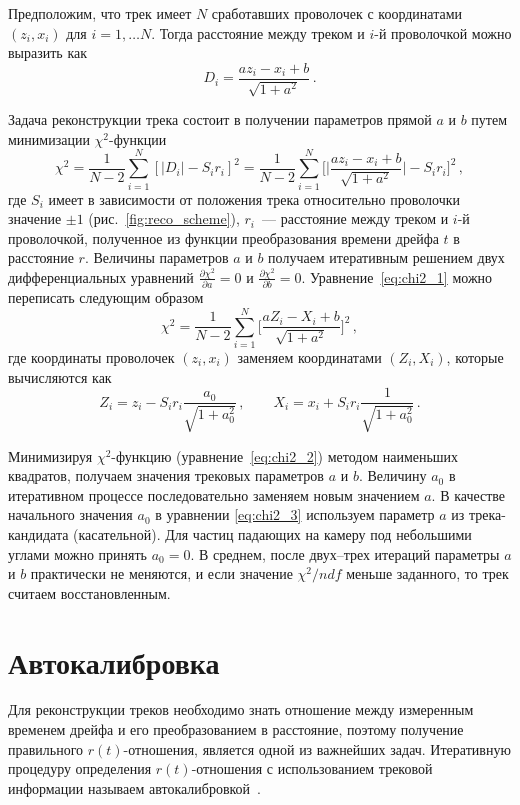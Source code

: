 Предположим, что трек имеет $N$ сработавших проволочек с координатами
$(z_i, x_i)$ для $i = 1, \ldots N$. Тогда расстояние между треком и $i$-й
проволочкой можно выразить как
\begin{equation}
  D_i = \frac{a z_i - x_i + b}{\sqrt{1 + a^{2}}}\,.
\end{equation}

Задача реконструкции трека состоит в получении параметров прямой $a$ и $b$
путем минимизации $\chi^2$-функции
\begin{equation}
  \label{eq:chi2_1}
  \chi^2 = \frac{1}{N-2}\sum_{i=1}^{N} [|D_i| -S_ir_i]^2 =
  \frac{1}{N-2}\sum_{i=1}^{N} \biggl[
    \Big|\frac{az_i - x_i + b}{\sqrt{1 + a^2}}\Big| - S_ir_i\biggr]^2\,,
\end{equation}
где $S_i$ имеет в зависимости от положения трека относительно проволочки
значение $\pm{1}$ (рис.~\ref{fig:reco_scheme}), $r_i$~--- расстояние между
треком и $i$-й проволочкой, полученное из функции преобразования времени дрейфа
$t$ в расстояние $r$. Величины параметров $a$ и $b$ получаем итеративным
решением двух дифференциальных уравнений
$\frac{\partial \chi^2}{\partial a} = 0$ и
$\frac{\partial \chi^2}{\partial b} = 0$.
Уравнение~\eqref{eq:chi2_1} можно переписать следующим образом
\begin{equation}
  \label{eq:chi2_2}
  \chi^2 = \frac{1}{N-2}\sum_{i=1}^{N}
  \biggl[\frac{aZ_i - X_i + b}{\sqrt{1 + a^2}}\biggr]^2\,,
\end{equation}
где координаты проволочек $(z_i, x_i)$ заменяем координатами $(Z_i, X_i)$,
которые вычисляются как
\begin{equation}
  \label{eq:chi2_3}
  Z_i = z_i - S_ir_i \frac{a_0}{\sqrt{1 + a_0^2}}\,, \qquad
  X_i = x_i + S_ir_i \frac{1}{\sqrt{1 + a_0^2}}\,.
\end{equation}

Минимизируя $\chi^2$-функцию (уравнение~\eqref{eq:chi2_2}) методом наименьших
квадратов, получаем значения трековых параметров $a$ и $b$. Величину $a_0$ в
итеративном процессе последовательно заменяем новым значением $a$. В качестве
начального значения $a_0$ в уравнении \eqref{eq:chi2_3} используем параметр $a$
из трека-кандидата (касательной). Для частиц падающих на камеру под небольшими
углами можно принять $a_0 = 0$. В среднем, после двух--трех итераций параметры
$a$ и $b$ практически не меняются, и если значение $\chi^2/ndf$ меньше
заданного, то трек считаем восстановленным.

\section{Автокалибровка}
Для реконструкции треков необходимо знать отношение между измеренным временем
дрейфа и его преобразованием в расстояние, поэтому получение правильного
$r(t)$-отношения, является одной из важнейших задач. Итеративную процедуру
определения $r(t)$-отношения с использованием трековой информации называем
автокалибровкой~\cite{bac97,pet05}.

